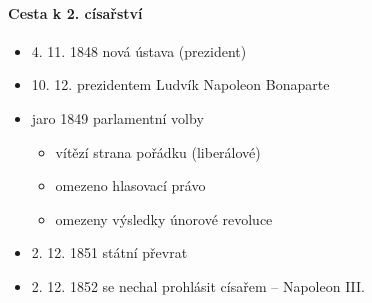 \paragraph{Cesta k 2. císařství}
\begin{itemize}
\item 4. 11. 1848 nová ústava (prezident)
\item 10. 12. prezidentem Ludvík Napoleon Bonaparte
\item jaro 1849 parlamentní volby
	\begin{itemize}
	\item vítězí strana pořádku (liberálové)
	\item omezeno hlasovací právo
	\item omezeny výsledky únorové revoluce 
	\end{itemize}
\item 2. 12. 1851 státní převrat
\item 2. 12. 1852 se nechal prohlásit císařem -- Napoleon III.
\end{itemize}

